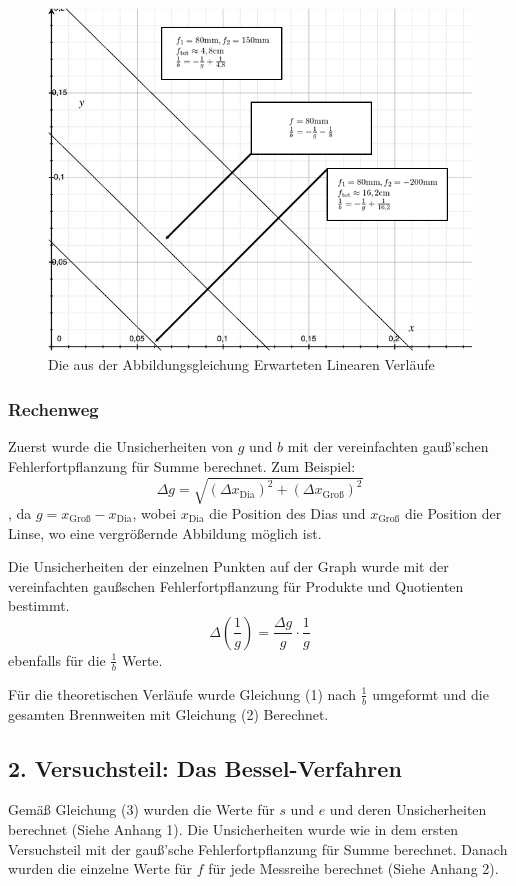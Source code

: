 \documentclass[11pt,a4paper]{article}
\begin{document}
\begin{figure}
	\centering
	\includegraphics[scale=0.5]{Abb3}
	\caption{ Die aus der Abbildungsgleichung Erwarteten Linearen Verläufe}
\end{figure} 

\begin{tcolorbox}[colback=white]
\subsubsection{Rechenweg}
Zuerst wurde die Unsicherheiten von $g$ und $b$ mit der vereinfachten gauß'schen Fehlerfortpflanzung für Summe berechnet. Zum Beispiel:
$$ \Delta g = \sqrt{(\Delta x_\textrm{Dia})^2 + (\Delta x_\textrm{Groß})^2}$$
, da $g = x_\textrm{Groß} - x_\textrm{Dia}$, wobei $x_\textrm{Dia}$ die Position des Dias und $x_\textrm{Groß}$ die Position der Linse, wo eine vergrößernde Abbildung möglich ist. 

Die Unsicherheiten der einzelnen Punkten auf der Graph wurde mit der vereinfachten gaußschen Fehlerfortpflanzung für Produkte und Quotienten bestimmt.
$$ \Delta\left(\frac{1}{g}\right) = \frac{\Delta g}{g} \cdot \frac{1}{g}$$
ebenfalls für die $\frac{1}{b}$ Werte. 
	
Für die theoretischen Verläufe wurde Gleichung (1) nach $\frac{1}{b}$ umgeformt und die gesamten Brennweiten mit Gleichung (2) Berechnet. 
	
	
\end{tcolorbox}

\subsection{2. Versuchsteil: Das Bessel-Verfahren}
Gemäß Gleichung (3) wurden die Werte für $s$ und $e$ und deren Unsicherheiten berechnet (Siehe Anhang 1). Die Unsicherheiten wurde wie in dem ersten Versuchsteil mit der gauß'sche Fehlerfortpflanzung für Summe berechnet. Danach wurden die einzelne Werte für $f$ für jede Messreihe berechnet (Siehe Anhang 2). 
\end{document}
